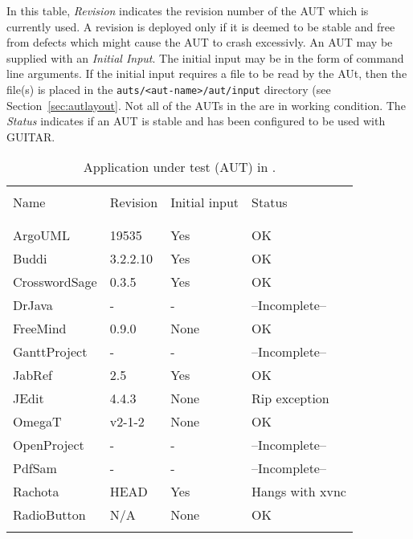 In this table, \textit{Revision} indicates the revision number of the AUT which is currently used. A revision is deployed only if it is deemed to be stable and free from defects which might cause the AUT to crash excessivly. An AUT may be supplied with an \textit{Initial Input}. The initial input may be in the form of command line arguments. If the initial input requires a file to be read by the AUt, then the file(s) is placed in the \texttt{auts/<aut-name>/aut/input} directory (see Section~\ref{sec:autlayout}. Not all of the AUTs in the \mddozen{} are in working condition. The \textit{Status} indicates if an AUT is stable and has been configured to be used with GUITAR.

%
%
\begin{table}[tbp]
   \centering
   \begin{tabular}{l l l l}
      & & & \\
      \hline
      & & & \\
      Name          & Revision & Initial input & Status            \\
      & & & \\
      \hline
      & & & \\
      ArgoUML       & 19535    & Yes           & OK                \\
      Buddi         & 3.2.2.10 & Yes           & OK                \\
      CrosswordSage & 0.3.5    & Yes           & OK                \\
      DrJava        & -        & -             & --Incomplete--    \\
      FreeMind      & 0.9.0    & None          & OK                \\
      GanttProject  & -        & -             & --Incomplete--    \\
      JabRef        & 2.5      & Yes           & OK                \\
      JEdit         & 4.4.3    & None          & Rip exception     \\
      OmegaT        & v2-1-2   & None          & OK                \\
      OpenProject   & -        & -             & --Incomplete--    \\
      PdfSam        & -        & -             & --Incomplete--    \\
      Rachota       & HEAD     & Yes           & Hangs with xvnc   \\
      RadioButton   & N/A      & None          & OK                \\
      & & & \\
   \end{tabular}

   \caption{Application under test (AUT) in \mddozen{}.}
   \label{table:aut}
\end{table}


